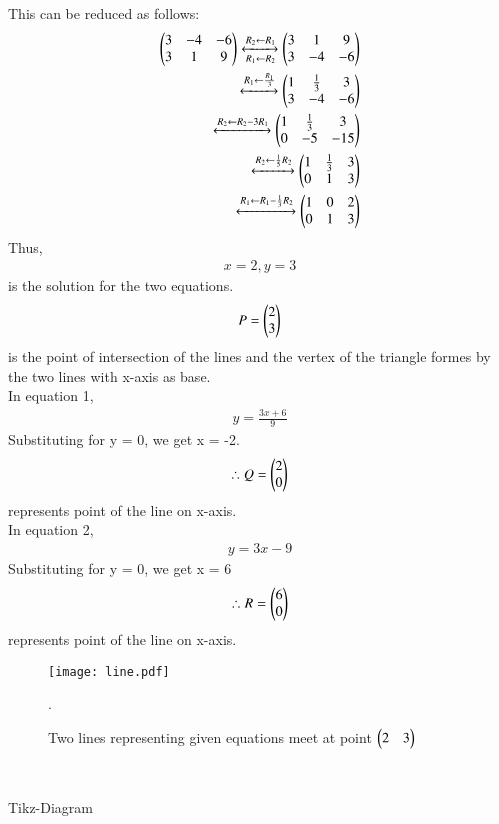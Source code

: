 \documentclass[journal,12pt,twocolumn]{IEEEtran}
\renewcommand\thesection{\arabic{section}}
\begin{document}
\begin{enumerate}[label=\thesection.\arabic*.,ref=\thesection.\theenumi]
This can be reduced as follows:
\begin{align}
    \begin{pmatrix}3 & -4 & -6\\
           3 & 1 & 9\end{pmatrix}
    \xleftrightarrow[R_1 \leftarrow R_2]
    {R_2 \leftarrow R_1}
    \begin{pmatrix}3 & 1 & 9\\
          3 & -4 & -6\end{pmatrix}\\
    \xleftrightarrow{R_1 \leftarrow \frac{R_1}{3}}
    \begin{pmatrix}1 &\frac{1}{3}&3\\
        3&-4&-6\end{pmatrix}\\
    \xleftrightarrow{R_2\leftarrow R_2-3R_1}
    \begin{pmatrix}1&\frac{1}{3}&3\\0&-5&-15\end{pmatrix}\\
    \xleftrightarrow{R_2\leftarrow \frac{1}{5}R_2}
    \begin{pmatrix}1&\frac{1}{3}&3\\0&1&3\end{pmatrix}\\
    \xleftrightarrow{R_1\leftarrow R_1-\frac{1}{3}R_2}
    \begin{pmatrix}1&0&2\\0&1&3\end{pmatrix}
\end{align}
Thus,
\begin{align}
    x=2, y=3
\end{align} 
is the solution for the two equations. 
\begin{align}
    P=\begin{pmatrix}2\\3\end{pmatrix}
\end{align}
is the point of intersection of the lines and the vertex of the triangle formes by the two lines with x-axis as base.
\\
In equation 1,
\begin{align}
    y=\frac{3x+6}{9}
\end{align}
Substituting for y = 0, we get x = -2.
\begin{align}
    \therefore Q=\begin{pmatrix}2\\0\end{pmatrix}
\end{align}
represents point of the line on x-axis.
\\
In equation 2,
\begin{align}
    y=3x-9
\end{align}
Substituting for y = 0, we get x = 6
\begin{align}
    \therefore R=\begin{pmatrix}6\\0\end{pmatrix}
\end{align}
represents point of the line on x-axis.
\begin{figure}[h]
\texttt{[image: line.pdf]}
\caption{Two lines representing given equations meet at point $\begin{pmatrix}2 & 3\end{pmatrix}$ }.
\end{figure}
\\
\begin{center}
    Tikz-Diagram
\end{center}
\end{enumerate}
\end{document}
